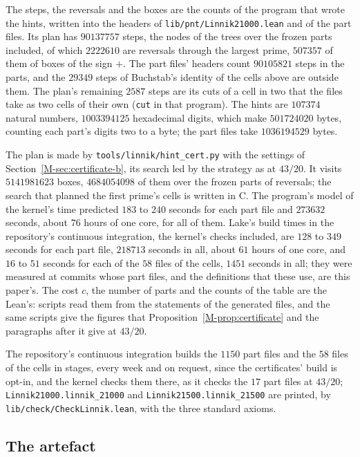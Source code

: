 \documentclass[11pt]{article}
\newcommand{\lean}[1]{\texttt{#1}}
\newcommand{\file}[1]{\nolinkurl{#1}}
\numberwithin{equation}{section}
\begin{document}
The steps, the reversals and the boxes are the counts of the program that wrote the hints, written into the headers of
\file{lib/pnt/Linnik21000.lean} and of the part files. Its plan has $90137757$ steps, the nodes of the trees over the
frozen parts included, of which $2222610$ are reversals through the largest prime, $507357$ of them of boxes of the
sign $+$. The part files' headers count $90105821$ steps in the parts, and the $29349$ steps of Buchstab's identity of
the cells above are outside them. The plan's remaining $2587$ steps are its cuts of a cell in two that the files take
as two cells of their own (\texttt{cut} in that program). The hints are $107374$ natural numbers, $1003394125$
hexadecimal digits, which make $501724020$ bytes, counting each part's digits two to a byte; the part files take
$1036194529$ bytes.

The plan is made by \file{tools/linnik/hint\_cert.py} with the settings of Section~\ref{M-sec:certificate-b},
its search led by the strategy as at $43/20$. It visits $5141981623$ boxes, $4684054098$ of them over the frozen parts
of reversals; the search that planned the first prime's cells is written in C. The program's model of the kernel's
time predicted $183$ to $240$ seconds for each part file and $273632$ seconds, about $76$ hours of one core, for all
of them. Lake's build times in the repository's continuous integration, the kernel's checks included, are $128$ to
$349$ seconds for each part file, $218713$ seconds in all, about $61$ hours of one core, and $16$ to $51$ seconds for
each of the $58$ files of the cells, $1451$ seconds in all; they were measured at commits whose part files, and the
definitions that these use, are this paper's. The cost $c$, the number of parts and the
counts of the table are the Lean's: scripts read them from the statements of the generated files, and the same scripts
give the figures that Proposition~\ref{M-prop:certificate} and the paragraphs after it give at $43/20$.

The repository's continuous integration builds the $1150$ part files and the $58$ files of the cells in stages, every
week and on request, since the certificates' build is opt-in, and the kernel checks them there, as it checks the $17$
part files at $43/20$; \lean{Linnik21000.linnik\_21000} and \lean{Linnik21500.linnik\_21500} are printed, by
\file{lib/check/CheckLinnik.lean}, with the three standard axioms.

\subsection*{The artefact}
\end{document}
